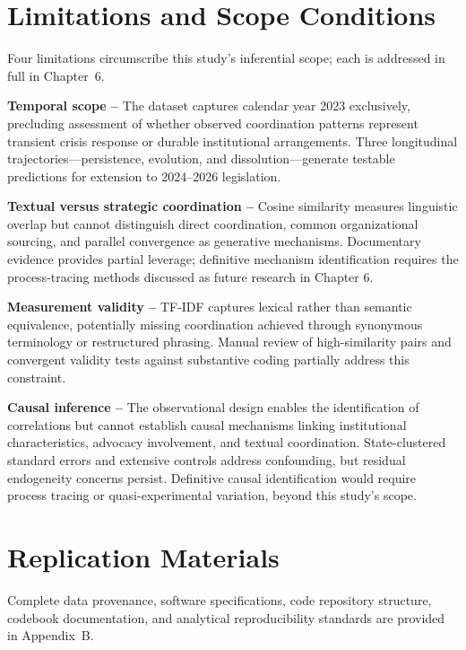 \section{Limitations and Scope Conditions}
\label{sec:limitations}
Four limitations circumscribe this study's inferential scope; each is addressed in full in Chapter~6.

\textbf{Temporal scope --} The dataset captures calendar year 2023 exclusively, precluding assessment of whether observed coordination patterns represent transient crisis response or durable institutional arrangements. Three longitudinal trajectories---persistence, evolution, and dissolution---generate testable predictions for extension to 2024--2026 legislation.

\textbf{Textual versus strategic coordination --} Cosine similarity measures linguistic overlap but cannot distinguish direct coordination, common organizational sourcing, and parallel convergence as generative mechanisms. Documentary evidence provides partial leverage; definitive mechanism identification requires the process-tracing methods discussed as future research in Chapter 6.

\textbf{Measurement validity --} TF-IDF captures lexical rather than semantic equivalence, potentially missing coordination achieved through synonymous terminology or restructured phrasing. Manual review of high-similarity pairs and convergent validity tests against substantive coding partially address this constraint.

\textbf{Causal inference --} The observational design enables the identification of correlations but cannot establish causal mechanisms linking institutional characteristics, advocacy involvement, and textual coordination. State-clustered standard errors and extensive controls address 
confounding, but residual endogeneity concerns persist. Definitive causal identification would require process tracing or quasi-experimental variation, beyond this study's scope.

\section{Replication Materials}
Complete data provenance, software specifications, code repository structure, codebook documentation, and analytical reproducibility standards are provided in Appendix~B.
